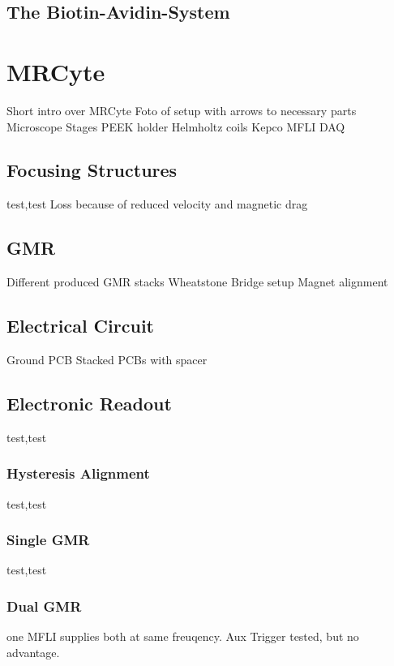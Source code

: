 \subsection{The Biotin-Avidin-System}


\section{MRCyte}
Short intro over MRCyte
Foto of setup with arrows to necessary parts
Microscope
Stages
PEEK holder
Helmholtz coils
Kepco
MFLI
DAQ
\subsection{Focusing Structures}
test,test
Loss because of reduced velocity and magnetic drag
\subsection{GMR}
Different produced GMR stacks
Wheatstone Bridge setup
Magnet alignment
\subsection{Electrical Circuit}
Ground
PCB
Stacked PCBs with spacer
\subsection{Electronic Readout}
test,test
\subsubsection{Hysteresis Alignment}
test,test
\subsubsection{Single GMR}
test,test
\subsubsection{Dual GMR}
one MFLI supplies both at same freuqency. Aux Trigger tested, but no advantage.


